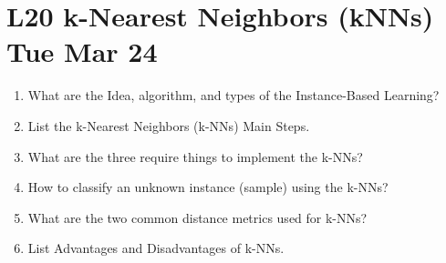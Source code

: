 \documentclass[12pt]{article}
\newenvironment{QandA}{\begin{enumerate}[label=\bfseries\arabic*.]\bfseries}
{\end{enumerate}}
\newenvironment{answered}{\par\normalfont\color{Sepia}}{}
\begin{document}
\section*{L20 k-Nearest Neighbors (kNNs) \textemdash{} Tue Mar 24}
\begin{QandA}
    \item What are the Idea, algorithm, and types of the Instance-Based Learning?
    \begin{answered}
    \end{answered}

    \item List the k-Nearest Neighbors (k-NNs) Main Steps.
    \begin{answered}
    \end{answered}

    \item What are the three require things to implement the k-NNs?
    \begin{answered}
    \end{answered}

    \item How to classify an unknown instance (sample) using the k-NNs?
    \begin{answered}
    \end{answered}

    \item What are the two common distance metrics used for k-NNs?
    \begin{answered}
    \end{answered}

    \item List Advantages and Disadvantages of k-NNs.
    \begin{answered}
    \end{answered}

\end{QandA}
\end{document}
